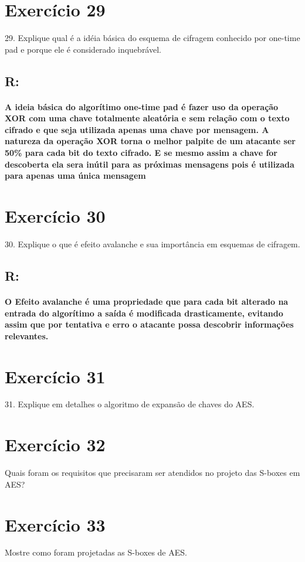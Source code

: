 \documentclass[10pt,a4paper]{article}
\begin{document}
\section*{Exercício 29}
29. Explique qual é a idéia básica do esquema de cifragem conhecido por one-time pad e porque ele é considerado inquebrável.
\subsection*{R:}	
\paragraph*{A ideia básica do algorítimo one-time pad é fazer uso da operação XOR com uma chave totalmente aleatória e sem relação com o texto cifrado e que seja utilizada apenas uma chave por mensagem. A natureza da operação XOR torna o melhor palpite de um atacante ser 50\% para cada bit do texto cifrado. E se mesmo assim a chave for descoberta ela sera inútil para as próximas mensagens pois é utilizada para apenas uma única mensagem}
\section*{Exercício 30}
30. Explique o que é efeito avalanche e sua importância em esquemas de cifragem.\\
\subsection*{R:}
\paragraph*{O Efeito avalanche é uma propriedade que para cada bit alterado na entrada do algorítimo a saída é modificada drasticamente, evitando assim que por tentativa e erro o atacante possa descobrir informações relevantes. }
\section*{Exercício 31}
31. Explique em detalhes o algoritmo de expansão de chaves do AES.\\
\section*{Exercício 32}
Quais foram os requisitos que precisaram ser atendidos no projeto das S-boxes em AES?\\
\section*{Exercício 33}
Mostre como foram projetadas as S-boxes de AES.
\end{document}
